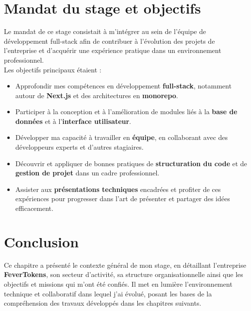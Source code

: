 
\section{Mandat du stage et objectifs}
\vskip1mm
Le mandat de ce stage consistait à m'intégrer au sein de l'équipe de développement full-stack afin de contribuer à l'évolution des projets de l'entreprise et d'acquérir une expérience pratique dans un environnement professionnel.\\[5mm]
Les objectifs principaux étaient :
\begin{itemize}
  \leftskip.75cm
    \item Approfondir mes compétences en développement \textbf{full-stack}, notamment autour de \textbf{Next.js} et des architectures en \textbf{monorepo}.
    \item Participer à la conception et à l'amélioration de modules liés à la \textbf{base de données} et à l'\textbf{interface utilisateur}.
    \item Développer ma capacité à travailler en \textbf{équipe}, en collaborant avec des développeurs experts et d'autres stagiaires.
    \item Découvrir et appliquer de bonnes pratiques de \textbf{structuration du code} et de \textbf{gestion de projet} dans un cadre professionnel.
    \item Assister aux \textbf{présentations techniques} encadrées et profiter de ces expériences pour progresser dans l'art de présenter et partager des idées efficacement.
\end{itemize}
\clearpage

\section{Conclusion}
Ce chapitre a présenté le contexte général de mon stage, en détaillant l'entreprise \textbf{\textcolor{ftRed}{FeverTokens}}, son secteur d'activité, sa structure organisationnelle ainsi que les objectifs et missions qui m'ont été confiés. Il met en lumière l'environnement technique et collaboratif dans lequel j'ai évolué, posant les bases de la compréhension des travaux développés dans les chapitres suivants.